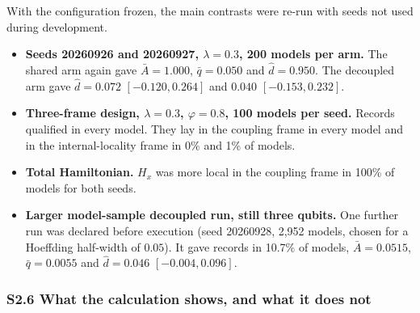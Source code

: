 \documentclass[
  10pt,
  a4paper,
]{article}
\providecommand{\tightlist}{%
  \setlength{\itemsep}{0pt}\setlength{\parskip}{0pt}}
\begin{document}
With the configuration frozen, the main contrasts were re-run with seeds
not used during development.

\begin{itemize}
\tightlist
\item
  \textbf{Seeds 20260926 and 20260927, \(\lambda=0.3\), 200 models per
  arm.} The shared arm again gave \(\bar A=1.000\), \(\bar q=0.050\) and
  \(\hat d=0.950\). The decoupled arm gave \(\hat d=0.072\)
  \([-0.120,0.264]\) and \(0.040\) \([-0.153,0.232]\).
\item
  \textbf{Three-frame design, \(\lambda=0.3\), \(\varphi=0.8\), 100
  models per seed.} Records qualified in every model. They lay in the
  coupling frame in every model and in the internal-locality frame in
  0\% and 1\% of models.
\item
  \textbf{Total Hamiltonian.} \(H_x\) was more local in the coupling
  frame in 100\% of models for both seeds.
\item
  \textbf{Larger model-sample decoupled run, still three qubits.} One
  further run was declared before execution (seed 20260928, 2,952
  models, chosen for a Hoeffding half-width of \(0.05\)). It gave
  records in 10.7\% of models, \(\bar A=0.0515\), \(\bar q=0.0055\) and
  \(\hat d=0.046\) \([-0.004,0.096]\).
\end{itemize}

\subsubsection{S2.6 What the calculation shows, and what it does
not}\label{s2.6-what-the-calculation-shows-and-what-it-does-not}
\end{document}
